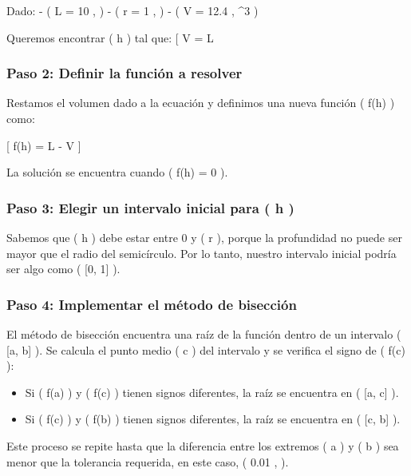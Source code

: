 \documentclass[
  letterpaper,
  DIV=11,
  numbers=noendperiod]{scrartcl}
\providecommand{\tightlist}{%
  \setlength{\itemsep}{0pt}\setlength{\parskip}{0pt}}\usepackage{longtable,booktabs,array}
\begin{document}
Dado: - ( L = 10 ,  ) - ( r = 1 ,  ) - ( V = 12.4 ,
\^{}3 )

Queremos encontrar ( h ) tal que: {[} V = L
\left[ 0.5 \pi r^2 - r^2 \arcsin\left(\frac{h}{r}\right) - h \left( r^2 - h^2 \right)^{1/2} \right]{]}

\subsubsection{Paso 2: Definir la función a
resolver}\label{paso-2-definir-la-funciuxf3n-a-resolver}

Restamos el volumen dado a la ecuación y definimos una nueva función (
f(h) ) como:

{[} f(h) = L
 -
V {]}

La solución se encuentra cuando ( f(h) = 0 ).

\subsubsection{Paso 3: Elegir un intervalo inicial para ( h
)}\label{paso-3-elegir-un-intervalo-inicial-para-h}

Sabemos que ( h ) debe estar entre 0 y ( r ), porque la profundidad no
puede ser mayor que el radio del semicírculo. Por lo tanto, nuestro
intervalo inicial podría ser algo como ( {[}0, 1{]} ).

\subsubsection{Paso 4: Implementar el método de
bisección}\label{paso-4-implementar-el-muxe9todo-de-bisecciuxf3n}

El método de bisección encuentra una raíz de la función dentro de un
intervalo ( {[}a, b{]} ). Se calcula el punto medio ( c ) del intervalo
y se verifica el signo de ( f(c) ):

\begin{itemize}
\tightlist
\item
  Si ( f(a) ) y ( f(c) ) tienen signos diferentes, la raíz se encuentra
  en ( {[}a, c{]} ).
\item
  Si ( f(c) ) y ( f(b) ) tienen signos diferentes, la raíz se encuentra
  en ( {[}c, b{]} ).
\end{itemize}

Este proceso se repite hasta que la diferencia entre los extremos ( a )
y ( b ) sea menor que la tolerancia requerida, en este caso, ( 0.01 ,
 ).
\end{document}

